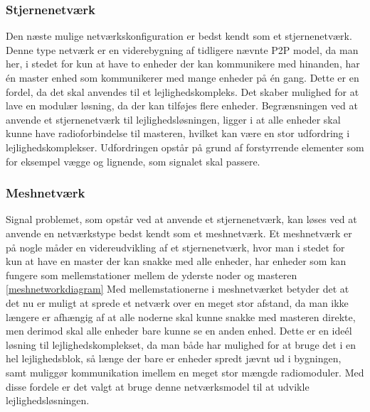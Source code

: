 \subsubsection*{Stjernenetværk}
Den næste mulige netværkskonfiguration  er bedst kendt som et stjernenetværk. Denne type netværk er en viderebygning af tidligere nævnte P2P model, da man her, i stedet for kun at have to enheder der kan kommunikere med hinanden, har én master enhed som kommunikerer med mange enheder på én gang. 
Dette er en fordel, da det skal anvendes til et lejlighedskompleks. Det skaber mulighed for at lave en modulær løsning, da der kan tilføjes flere enheder.
\newline
Begrænsningen ved at anvende et stjernenetværk til lejlighedsløsningen, ligger i at alle enheder skal kunne have radioforbindelse til masteren, hvilket kan være en stor udfordring i lejlighedskomplekser. Udfordringen opstår på grund af forstyrrende elementer som for eksempel vægge og lignende, som signalet skal passere.

\subsubsection*{Meshnetværk}
Signal problemet, som opstår ved at anvende et stjernenetværk, kan løses ved at anvende en netværkstype bedst kendt som et meshnetværk.
Et meshnetværk er på nogle måder en videreudvikling af et stjernenetværk, hvor man i stedet for kun at have en master der kan snakke med alle enheder, har enheder som kan fungere som mellemstationer mellem de yderste noder og masteren \ref{meshnetworkdiagram}
Med mellemstationerne i meshnetværket betyder det at det nu er muligt at sprede et netværk over en meget stor afstand, da man ikke længere er afhængig af at alle noderne skal kunne snakke med masteren direkte, men derimod skal alle enheder bare kunne se en anden enhed. Dette er en ideél løsning til lejlighedskomplekset, da man både har mulighed for at bruge det i en hel lejlighedsblok, så længe der bare er enheder spredt jævnt ud i bygningen, samt muliggør kommunikation imellem en meget stor mængde radiomoduler. Med disse fordele er det valgt at bruge denne netværksmodel til at udvikle lejlighedsløsningen.

